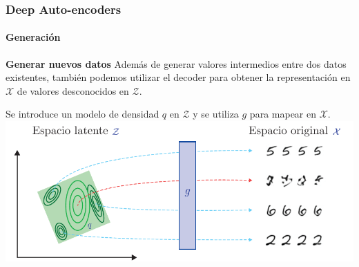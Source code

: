 \documentclass[aspectratio=169]{beamer}
\begin{document}


\begin{frame}[t]\frametitle{Deep Auto-encoders}\framesubtitle{Generación}
  \begin{block}{\textbf{Generar nuevos datos}}
    Además de generar valores intermedios entre dos datos existentes, también podemos utilizar el decoder para obtener la representación en $\mathcal{X}$ de valores desconocidos en $\mathcal{Z}$.
  \end{block}
  \vspace{.2cm}
  Se introduce un modelo de densidad $q$ en $\mathcal{Z}$ y se utiliza $g$ para mapear en $\mathcal{X}$.\\
  \vspace{.3cm}
  \includegraphics[width=.6\textwidth, center]{imgs/tema4/aenc/vae_motivation.pdf}\\
\end{frame}
\end{document}
